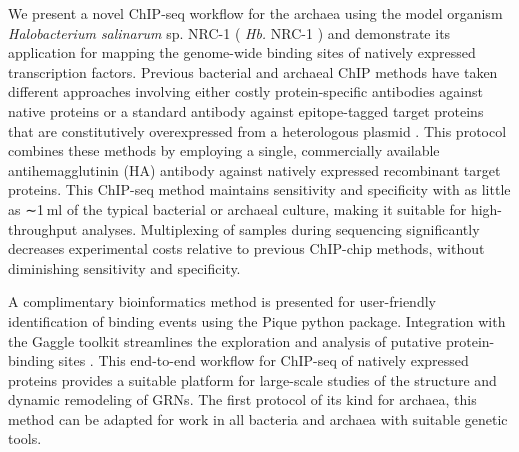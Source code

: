 We present a novel ChIP-seq workflow for the archaea using the model organism {\em Halobacterium salinarum} sp. NRC-1 ( {\em Hb.} NRC-1 ) and demonstrate its application for mapping the genome-wide binding sites of natively expressed transcription factors. Previous bacterial and archaeal ChIP methods have taken different approaches involving either costly protein-specific antibodies against native proteins \cite{lun_blind_2009} or a standard antibody against epitope-tagged target proteins that are constitutively overexpressed from a heterologous plasmid \cite{facciotti_general_2007, kaur_coordination_2010}. This protocol combines these methods by employing a single, commercially available antihemagglutinin (HA) antibody against natively expressed recombinant target proteins. This ChIP-seq method maintains sensitivity and specificity with as little as ∼1 ml of the typical bacterial or archaeal culture, making it suitable for high-throughput analyses. Multiplexing of samples during sequencing significantly decreases experimental costs relative to previous ChIP-chip methods, without diminishing sensitivity and specificity.

A complimentary bioinformatics method is presented for user-friendly identification of binding events using the Pique python package. Integration with the Gaggle toolkit streamlines the exploration and analysis of putative protein-binding sites \cite{bare_integration_2010, shannon2006gaggle}. This end-to-end workflow for ChIP-seq of natively expressed proteins provides a suitable platform for large-scale studies of the structure and dynamic remodeling of GRNs. The first protocol of its kind for archaea, this method can be adapted for work in all bacteria and archaea with suitable genetic tools.